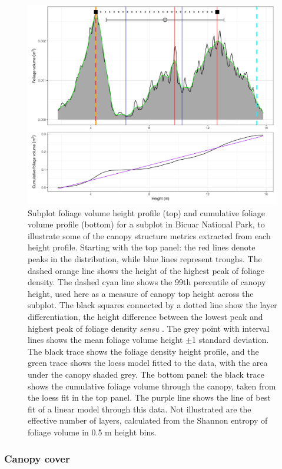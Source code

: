 \documentclass[11pt,a4paper]{article}
\begin{document}
\begin{figure}[H]
\centering
	\includegraphics[width=\textwidth]{height_profile_illus_all}
	\caption{Subplot foliage volume height profile (top) and cumulative foliage volume profile (bottom) for a subplot in Bicuar National Park, to illustrate some of the canopy structure metrics extracted from each height profile. Starting with the top panel: the red lines denote peaks in the distribution, while blue lines represent troughs. The dashed orange line shows the height of the highest peak of foliage density. The dashed cyan line shows the 99th percentile of canopy height, used here as a measure of canopy top height across the subplot. The black squares connected by a dotted line show the layer differentiation, the height difference between the lowest peak and highest peak of foliage density \textit{sensu} \citet{Palace2015}. The grey point with interval lines shows the mean foliage volume height $\pm$1 standard deviation. The black trace shows the foliage density height profile, and the green trace shows the loess model fitted to the data, with the area under the canopy shaded grey. The bottom panel: the black trace shows the cumulative foliage volume through the canopy, taken from the loess fit in the top panel. The purple line shows the line of best fit of a linear model through this data. Not illustrated are the effective number of layers, calculated from the Shannon entropy of foliage volume in 0.5 m height bins.}
	\label{height_profile_illus}
\end{figure}


\subsubsection{Canopy cover}
\end{document}

